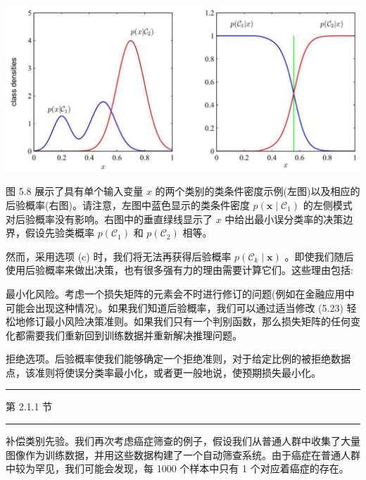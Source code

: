 \documentclass[10pt]{report}
\newcommand{\HRule}{\begin{center}\rule{0.9\linewidth}{0.2mm}\end{center}}
\begin{document}
\begin{center}
\includegraphics[max width=1.0\textwidth]{images/0194e279-9b28-703a-88f4-c3ac21e2010d_164_234_363_1297_607_0.jpg}
\end{center}
\hspace*{3em} 

图 5.8 展示了具有单个输入变量 \(x\) 的两个类别的类条件密度示例(左图)以及相应的后验概率(右图)。请注意，左图中蓝色显示的类条件密度 \(p\left( {\mathbf{x} \mid  {\mathcal{C}}_{1}}\right)\) 的左侧模式对后验概率没有影响。右图中的垂直绿线显示了 \(x\) 中给出最小误分类率的决策边界，假设先验类概率 \(p\left( {\mathcal{C}}_{1}\right)\) 和 \(p\left( {\mathcal{C}}_{2}\right)\) 相等。

然而，采用选项 (c) 时，我们将无法再获得后验概率 \(p\left( {{\mathcal{C}}_{k} \mid  \mathbf{x}}\right)\) 。即使我们随后使用后验概率来做出决策，也有很多强有力的理由需要计算它们。这些理由包括:

最小化风险。考虑一个损失矩阵的元素会不时进行修订的问题(例如在金融应用中可能会出现这种情况)。如果我们知道后验概率，我们可以通过适当修改 (5.23) 轻松地修订最小风险决策准则。如果我们只有一个判别函数，那么损失矩阵的任何变化都需要我们重新回到训练数据并重新解决推理问题。

拒绝选项。后验概率使我们能够确定一个拒绝准则，对于给定比例的被拒绝数据点，该准则将使误分类率最小化，或者更一般地说，使预期损失最小化。

\HRule

第 2.1.1 节

\HRule

补偿类别先验。我们再次考虑癌症筛查的例子，假设我们从普通人群中收集了大量图像作为训练数据，并用这些数据构建了一个自动筛查系统。由于癌症在普通人群中较为罕见，我们可能会发现，每 1000 个样本中只有 1 个对应着癌症的存在。
\end{document}
